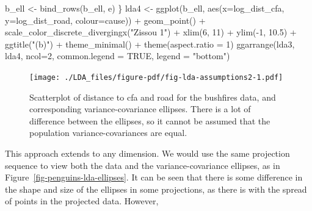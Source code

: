 \documentclass[
  letterpaper,
]{book}
\newenvironment{Shaded}{\begin{snugshade}}{\end{snugshade}}
\newcommand{\AttributeTok}[1]{\textcolor[rgb]{0.40,0.45,0.13}{#1}}
\newcommand{\ConstantTok}[1]{\textcolor[rgb]{0.56,0.35,0.01}{#1}}
\newcommand{\DecValTok}[1]{\textcolor[rgb]{0.68,0.00,0.00}{#1}}
\newcommand{\FloatTok}[1]{\textcolor[rgb]{0.68,0.00,0.00}{#1}}
\newcommand{\FunctionTok}[1]{\textcolor[rgb]{0.28,0.35,0.67}{#1}}
\newcommand{\NormalTok}[1]{\textcolor[rgb]{0.00,0.23,0.31}{#1}}
\newcommand{\OtherTok}[1]{\textcolor[rgb]{0.00,0.23,0.31}{#1}}
\newcommand{\SpecialCharTok}[1]{\textcolor[rgb]{0.37,0.37,0.37}{#1}}
\newcommand{\StringTok}[1]{\textcolor[rgb]{0.13,0.47,0.30}{#1}}
\begin{document}
\begin{Shaded}
\begin{Highlighting}[]
\NormalTok{  b\_ell }\OtherTok{\textless{}{-}} \FunctionTok{bind\_rows}\NormalTok{(b\_ell, e)}
\NormalTok{\}}
\NormalTok{lda4 }\OtherTok{\textless{}{-}} \FunctionTok{ggplot}\NormalTok{(b\_ell, }\FunctionTok{aes}\NormalTok{(}\AttributeTok{x=}\NormalTok{log\_dist\_cfa, }
                         \AttributeTok{y=}\NormalTok{log\_dist\_road, }
                         \AttributeTok{colour=}\NormalTok{cause)) }\SpecialCharTok{+}
  \FunctionTok{geom\_point}\NormalTok{() }\SpecialCharTok{+}
  \FunctionTok{scale\_color\_discrete\_divergingx}\NormalTok{(}\StringTok{"Zissou 1"}\NormalTok{) }\SpecialCharTok{+}
  \FunctionTok{xlim}\NormalTok{(}\DecValTok{6}\NormalTok{, }\DecValTok{11}\NormalTok{) }\SpecialCharTok{+} \FunctionTok{ylim}\NormalTok{(}\SpecialCharTok{{-}}\DecValTok{1}\NormalTok{, }\FloatTok{10.5}\NormalTok{) }\SpecialCharTok{+}
  \FunctionTok{ggtitle}\NormalTok{(}\StringTok{"(b)"}\NormalTok{) }\SpecialCharTok{+}
  \FunctionTok{theme\_minimal}\NormalTok{() }\SpecialCharTok{+}
  \FunctionTok{theme}\NormalTok{(}\AttributeTok{aspect.ratio =} \DecValTok{1}\NormalTok{)}
\FunctionTok{ggarrange}\NormalTok{(lda3, lda4, }\AttributeTok{ncol=}\DecValTok{2}\NormalTok{, }
          \AttributeTok{common.legend =} \ConstantTok{TRUE}\NormalTok{, }\AttributeTok{legend =} \StringTok{"bottom"}\NormalTok{)}
\end{Highlighting}
\end{Shaded}

\begin{figure}[H]

{\centering \texttt{[image: ./LDA\_files/figure-pdf/fig-lda-assumptions2-1.pdf]}

}

\caption{\label{fig-lda-assumptions2}Scatterplot of distance to cfa and
road for the bushfires data, and corresponding variance-covariance
ellipses. There is a lot of difference between the ellipses, so it
cannot be assumed that the population variance-covariances are equal.}

\end{figure}

This approach extends to any dimension. We would use the same projection
sequence to view both the data and the variance-covariance ellipses, as
in Figure~\ref{fig-penguins-lda-ellipses}. It can be seen that there is
some difference in the shape and size of the ellipses in some
projections, as there is with the spread of points in the projected
data. However,
\end{document}
